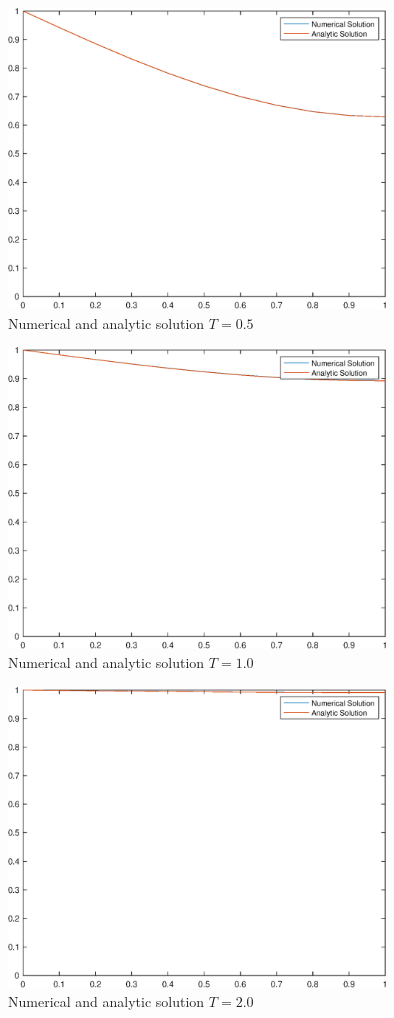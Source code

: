 \documentclass[10pt,a4paper,notitlepage]{article}
\begin{document}
\begin{figure}[H]
\begin{center}
\includegraphics[width=10cm]{Image_3_4}
\caption{Numerical and analytic solution $T=0.5$}
\end{center}
\end{figure}
\begin{figure}[H]
\begin{center}
\includegraphics[width=10cm]{Image_3_5}
\caption{Numerical and analytic solution $T=1.0$}
\end{center}
\end{figure}
\begin{figure}[H]
\begin{center}
\includegraphics[width=10cm]{Image_3_6}
\caption{Numerical and analytic solution $T=2.0$}
\end{center}
\end{figure}
\end{document}

